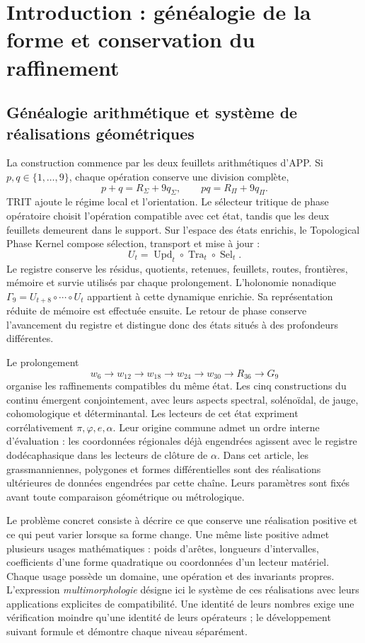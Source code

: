 \documentclass[a4paper,10pt]{article}
\theoremstyle{definition}\newtheorem{definition}[theorem]{Définition}
\theoremstyle{remark}\newtheorem{remark}[theorem]{Remarque}
\numberwithin{equation}{section}
\begin{document}
\section{Introduction : généalogie de la forme et conservation du raffinement}
\label{sec:genealogy}

\subsection{Généalogie arithmétique et système de réalisations géométriques}
La construction commence par les deux feuillets arithmétiques d’APP. Si
\(p,q\in\{1,\ldots,9\}\), chaque opération conserve une division complète,
\[
 p+q=R_\Sigma+9q_\Sigma,\qquad
 pq=R_\Pi+9q_\Pi.
\]
TRIT ajoute le régime local et l'orientation. Le sélecteur tritique de phase opératoire choisit l'opération compatible avec cet état, tandis que les deux feuillets demeurent dans le support. Sur l'espace des états enrichis, le Topological Phase Kernel compose sélection, transport et mise à jour :
\[
 U_t=\operatorname{Upd}_t\circ\operatorname{Tra}_t\circ\operatorname{Sel}_t.
\]
Le registre conserve les résidus, quotients, retenues, feuillets, routes, frontières, mémoire et survie utilisés par chaque prolongement. L'holonomie nonadique \(\Gamma_9=U_{t+8}\circ\cdots\circ U_t\) appartient à cette dynamique enrichie. Sa représentation réduite de mémoire est effectuée ensuite. Le retour de phase conserve l'avancement du registre et distingue donc des états situés à des profondeurs différentes.

Le prolongement
\[
 w_6\longrightarrow w_{12}\longrightarrow w_{18}\longrightarrow
 w_{24}\longrightarrow w_{30}\longrightarrow R_{36}\longrightarrow G_9
\]
organise les raffinements compatibles du même état. Les cinq constructions du continu émergent conjointement, avec leurs aspects spectral, solénoïdal, de jauge, cohomologique et déterminantal. Les lecteurs de cet état expriment corrélativement \(\pi,\varphi,e,\alpha\). Leur origine commune admet un ordre interne d'évaluation : les coordonnées régionales déjà engendrées agissent avec le registre dodécaphasique dans les lecteurs de clôture de \(\alpha\). Dans cet article, les grassmanniennes, polygones et formes différentielles sont des réalisations ultérieures de données engendrées par cette chaîne. Leurs paramètres sont fixés avant toute comparaison géométrique ou métrologique.

Le problème concret consiste à décrire ce que conserve une réalisation
positive et ce qui peut varier lorsque sa forme change. Une même liste positive
admet plusieurs usages mathématiques : poids d’arêtes, longueurs d’intervalles,
coefficients d’une forme quadratique ou coordonnées d’un lecteur matériel.
Chaque usage possède un domaine, une opération et des invariants propres.
L’expression \emph{multimorphologie} désigne ici le système de ces réalisations
avec leurs applications explicites de compatibilité. Une identité de leurs nombres
exige une vérification moindre qu’une identité de leurs opérateurs ; le
développement suivant formule et démontre chaque niveau séparément.
\end{document}
